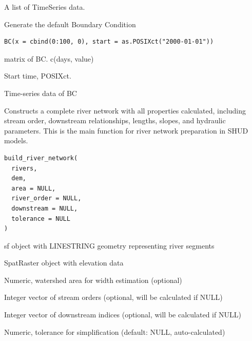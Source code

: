 \documentclass[a4paper]{book}
\begin{document}
%
\begin{Value}
A list of TimeSeries data.
\end{Value}
%
\begin{Description}\relax
Generate the default Boundary Condition
\end{Description}
%
\begin{Usage}
\begin{verbatim}
BC(x = cbind(0:100, 0), start = as.POSIXct("2000-01-01"))
\end{verbatim}
\end{Usage}
%
\begin{Arguments}
\begin{ldescription}
\item[\code{x}] matrix of BC. c(days, value)

\item[\code{start}] Start time, POSIXct.
\end{ldescription}
\end{Arguments}
%
\begin{Value}
Time-series data of BC
\end{Value}
%
\begin{Description}\relax
Constructs a complete river network with all properties calculated,
including stream order, downstream relationships, lengths, slopes,
and hydraulic parameters. This is the main function for river network
preparation in SHUD models.
\end{Description}
%
\begin{Usage}
\begin{verbatim}
build_river_network(
  rivers,
  dem,
  area = NULL,
  river_order = NULL,
  downstream = NULL,
  tolerance = NULL
)
\end{verbatim}
\end{Usage}
%
\begin{Arguments}
\begin{ldescription}
\item[\code{rivers}] sf object with LINESTRING geometry representing river segments

\item[\code{dem}] SpatRaster object with elevation data

\item[\code{area}] Numeric, watershed area for width estimation (optional)

\item[\code{river\_order}] Integer vector of stream orders (optional, will be calculated if NULL)

\item[\code{downstream}] Integer vector of downstream indices (optional, will be calculated if NULL)

\item[\code{tolerance}] Numeric, tolerance for simplification (default: NULL, auto-calculated)
\end{ldescription}
\end{Arguments}
\end{document}
